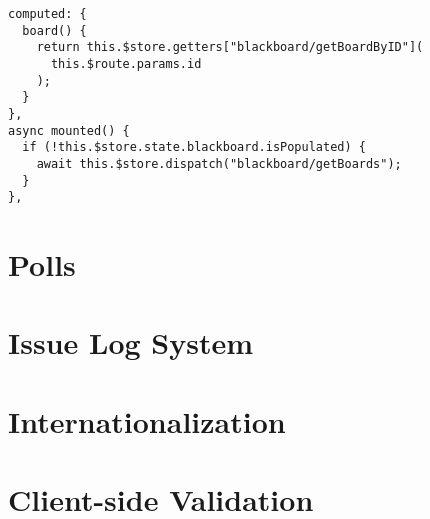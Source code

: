 \begin{lstlisting}[caption=Population of Entries, captionpos=b, style=htmlcssjs, label=noticeboardpopulation] computed: {
  board() {
    return this.$store.getters["blackboard/getBoardByID"](
      this.$route.params.id
    );
  }
},
async mounted() {
  if (!this.$store.state.blackboard.isPopulated) {
    await this.$store.dispatch("blackboard/getBoards");
  }
},
\end{lstlisting}

\section{Polls}

\section{Issue Log System}

\section{Internationalization} \label{sec:internationalization}

\section{Client-side Validation}
